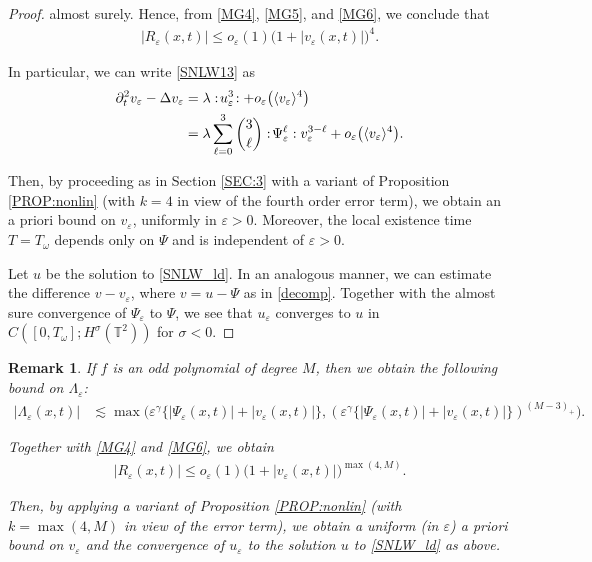 \documentclass[letterpaper, 11pt,  reqno]{amsart}
\newtheorem{remark}[theorem]{Remark}
\newcommand{\1}{\hspace{0.5mm}\text{I}\hspace{0.5mm}}
\newcommand{\noi}{\noindent}
\newcommand{\T}{\mathbb{T}}
\newcommand{\Dl}{\Delta}
\newcommand{\eps}{\varepsilon}
\newcommand{\g}{\gamma}
\newcommand{\ld}{\lambda}
\newcommand{\Ld}{\Lambda}
\newcommand{\s}{\sigma}
\newcommand{\dt}{\partial_t}
\renewcommand{\l}{\ell}
\renewcommand{\o}{\omega}
\newcommand{\les}{\lesssim}
\newcommand{\jb}[1]
{\langle #1 \rangle}
\numberwithin{equation}{section}
\numberwithin{theorem}{section}
\begin{document}
\begin{proof}
\noi
almost surely.
Hence, from \eqref{MG4}, \eqref{MG5}, and \eqref{MG6}, 
we conclude that 
\begin{align*}
 | R_{\eps} (x, t ) | \leq o_{\eps} (1) \big(1 + |   v_{\eps} (x, t) |\big)^4 . 
\end{align*}



\noi
In particular, we can write \eqref{SNLW13} as 
\begin{align*}
 \dt^2 v_\eps - \Dl v_\eps 
 & = \ld  :\! u_\eps^3\!: 
+ o_\eps\big(\jb{ v_{\eps}}^4\big) \notag\\
& = 
\ld   \sum_{\l=0}^3 {3\choose \l} :\! \Psi_\eps^\l \,  \!: v_\eps^{3-\ell}
  + o_\eps\big(\jb{ v_{\eps}}^4\big).
 \end{align*}

\noi
Then, by proceeding  as in Section \ref{SEC:3}
with a variant of Proposition \ref{PROP:nonlin} 
(with $k = 4$ in view of the fourth order error term), 
 we obtain an a priori bound on $v_\eps$, uniformly in $\eps > 0$.
Moreover, the local existence time $T = T_\o $ 
depends only on $\Psi$
and is independent of $\eps>0$.

Let $u$ be the solution to \eqref{SNLW_ld}.
In an analogous manner, we can estimate the difference $v -v_\eps$, 
where $v = u - \Psi$ as in \eqref{decomp}.
Together with the almost sure convergence of $\Psi_\eps$ to $\Psi$, 
we see that $u_\eps$ converges to $u$ in $C([0, T_\o]; H^\s(\T^2))$
for $\s < 0$.
\end{proof}


\begin{remark}\label{REM:poly}\rm
If $f$ is an odd polynomial of degree $M$, then 
we obtain the following bound on $\Ld_\eps$:
\begin{align*} 
| \Ld_\eps (x, t) | 
& \les 
\max\Big(\eps^{\g} \big\{|    \Psi_{\eps} (x, t) | + | v_{\eps} (x, t) |\big\} , 
(\eps^{\g} \big\{|    \Psi_{\eps} (x, t) | + | v_{\eps} (x, t) |\big\})^{(M-3)_+}\Big).
\end{align*}

\noi
Together with \eqref{MG4} and \eqref{MG6}, we obtain 
\begin{align*} | R_{\eps} (x, t ) | \leq o_{\eps} (1) 
\big(1 + |  v_{\eps} (x, t) |\big)^{\max(4, M)}. 
\end{align*}

 \noi
 Then, by applying 
 a variant of Proposition \ref{PROP:nonlin} 
(with $k = \max(4, M)$ in view of the  error term), 
 we obtain a uniform (in $\eps$) a priori bound on $v_\eps$
 and the convergence of $u_\eps$ to the solution $u$
 to \eqref{SNLW_ld} as above.


\end{remark}
\end{document}
